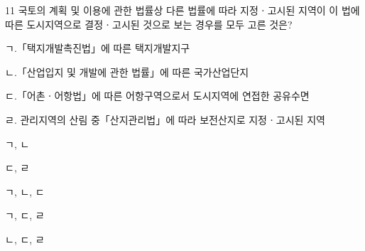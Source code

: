 \begin{question}{11}
국토의 계획 및 이용에 관한 법률상 다른 법률에 따라 지정ㆍ고시된 지역이 이 법에 따른 도시지역으로 결정ㆍ고시된 것으로 보는 경우를 모두 고른 것은?
\begin{framedtext}
ㄱ.「택지개발촉진법」에 따른 택지개발지구 \par
ㄴ.「산업입지 및 개발에 관한 법률」에 따른 국가산업단지 \par
ㄷ.「어촌ㆍ어항법」에 따른 어항구역으로서 도시지역에 연접한 공유수면 \par
ㄹ. 관리지역의 산림 중「산지관리법」에 따라 보전산지로 지정ㆍ고시된 지역 \par
\end{framedtext}
\begin{choices}
  \item ㄱ, ㄴ
  \item ㄷ, ㄹ
  \item ㄱ, ㄴ, ㄷ
  \item ㄱ, ㄷ, ㄹ
  \item ㄴ, ㄷ, ㄹ
\end{choices}
\end{question}

